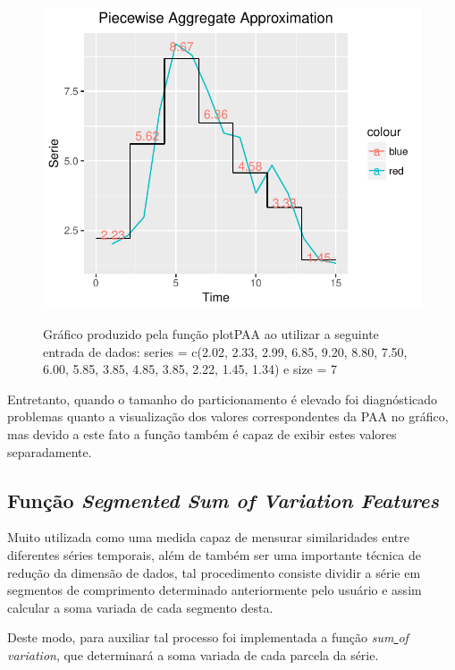 \documentclass[12pt,letterpaper]{article}
\begin{document}
\begin{figure}[!hbt]
	\begin{center}
		\includegraphics[width=\columnwidth]{PAA.pdf}
		\label{fig:PAA.pdf}
		\caption{Gráfico produzido pela função plotPAA ao utilizar a seguinte entrada de dados: series = c(2.02, 2.33, 2.99, 6.85, 9.20, 8.80, 7.50, 6.00, 5.85, 3.85, 4.85, 3.85, 2.22, 1.45, 1.34) e size = 7 }
	\end{center}
\end{figure}

Entretanto, quando o tamanho do particionamento é elevado foi diagnósticado problemas quanto a visualização dos valores correspondentes da PAA no gráfico, mas devido a este fato a função também é capaz de exibir estes valores separadamente.

\subsection{Função \textit{Segmented Sum of Variation Features}}

Muito utilizada como uma medida capaz de mensurar similaridades entre diferentes séries temporais, além de também ser uma importante técnica de redução da dimensão de dados, tal procedimento consiste dividir a série em segmentos de comprimento determinado anteriormente pelo usuário e assim calcular a soma variada de cada segmento desta.

Deste modo, para auxiliar tal processo foi implementada a função \textit{sum\underline{ }of\underline{ }variation}, que determinará a soma variada de cada parcela da série.\\
\end{document}
